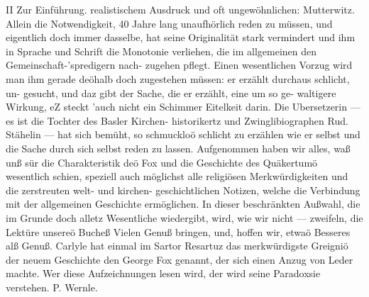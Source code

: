II Zur Einführung.
realistischem Ausdruck und oft ungewöhnlichen: Mutterwitz.
Allein die Notwendigkeit, 40 Jahre lang unaufhörlich reden zu
müssen, und eigentlich doch immer dasselbe, hat seine Originalität
stark vermindert und ihm in Sprache und Schrift die Monotonie
verliehen, die im allgemeinen den Gemeinschaft-'spredigern nach-
zugehen pflegt. Einen wesentlichen Vorzug wird man ihm gerade
deöhalb doch zugestehen müssen: er erzählt durchaus schlicht, un-
gesucht, und daz gibt der Sache, die er erzählt, eine um so ge-
waltigere Wirkung, eZ steckt ’auch nicht ein Schimmer Eitelkeit
darin. Die Ubersetzerin — es ist die Tochter des Basler Kirchen-
historikertz und Zwinglibiographen Rud. Stähelin — hat sich
bemüht, so schmuckloö schlicht zu erzählen wie er selbst und die
Sache durch sich selbst reden zu lassen. Aufgenommen haben wir
alles, waß unß sür die Charakteristik deö Fox und die Geschichte
des Quäkertumö wesentlich schien, speziell auch möglichst alle
religiösen Merkwürdigkeiten und die zerstreuten welt- und kirchen-
geschichtlichen Notizen, welche die Verbindung mit der allgemeinen
Geschichte ermöglichen. In dieser beschränkten Außwahl, die im
Grunde doch alletz Wesentliche wiedergibt, wird, wie wir nicht —
zweifeln, die Lektüre unsereö Bucheß Vielen Genuß bringen, und,
hoffen wir, etwaö Besseres alß Genuß. Carlyle hat einmal im
Sartor Resartuz das merkwürdigste Greigniö der neuem Geschichte
den George Fox genannt, der sich einen Anzug von Leder machte.
Wer diese Aufzeichnungen lesen wird, der wird seine Paradoxsie
verstehen. P. Wernle.

